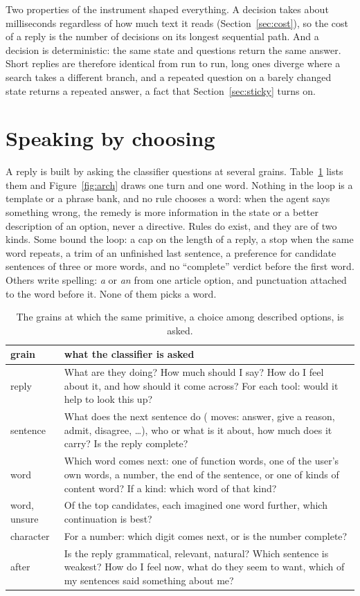 \documentclass[10pt,twocolumn]{article}
\begin{document}
Two properties of the instrument shaped everything. A decision takes about \MsPerCall{} milliseconds
regardless of how much text it reads (Section~\ref{sec:cost}), so the cost of a reply is the number
of decisions on its longest sequential path. And a decision is deterministic: the same state and
questions return the same answer. Short replies are therefore identical from run to run, long ones
diverge where a search takes a different branch, and a repeated question on a barely changed state
returns a repeated answer, a fact that Section~\ref{sec:sticky} turns on.

\section{Speaking by choosing}\label{sec:method}

A reply is built by asking the classifier questions at several grains. Table~\ref{tab:grains} lists
them and Figure~\ref{fig:arch} draws one turn and one word. Nothing in the loop is a template or a phrase bank, and no rule chooses a word: when the
agent says something wrong, the remedy is more information in the state or a better description of
an option, never a directive. Rules do exist, and they are of two kinds. Some bound the loop: a cap
on the length of a reply, a stop when the same word repeats, a trim of an unfinished last sentence,
a preference for candidate sentences of three or more words, and no ``complete'' verdict before the
first word. Others write spelling: \emph{a} or \emph{an} from one article option, and punctuation
attached to the word before it. None of them picks a word.

\begin{table}[t]
\small
\begin{tabularx}{\columnwidth}{@{}lX@{}}
\toprule
grain & what the classifier is asked \\
\midrule
reply & What are they doing? How much should I say? How do I feel about it, and how should it come
across? For each tool: would it help to look this up? \\
sentence & What does the next sentence do (\Moves{} moves: answer, give a reason, admit, disagree,
\ldots), who or what is it about, how much does it carry? Is the reply complete? \\
word & Which word comes next: one of \GrammarWords{} function words, one of the user's own words, a
number, the end of the sentence, or one of \ContentCategories{} kinds of content word? If a kind: which
word of that kind? \\
word, unsure & Of the top candidates, each imagined one word further, which continuation is best? \\
character & For a number: which digit comes next, or is the number complete? \\
after & Is the reply grammatical, relevant, natural? Which sentence is weakest? How do I feel now,
what do they seem to want, which of my sentences said something about me? \\
\bottomrule
\end{tabularx}
\caption{The grains at which the same primitive, a choice among described options, is asked.}
\label{tab:grains}
\end{table}
\end{document}
